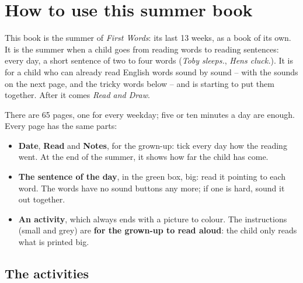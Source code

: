\section*{How to use this summer book}

This book is the summer of \textit{First Words}: its last 13 weeks, as
a book of its own. It is the summer when a child goes from reading words
to reading sentences: every day, a short sentence of two to four words
(\textit{Toby sleeps.}, \textit{Hens cluck.}). It is for a child who can
already read English words sound by sound -- with the sounds on the next
page, and the tricky words below -- and is starting to put them
together. After it comes \textit{Read and Draw}.

There are 65 pages, one for every weekday; five or ten minutes a day are
enough. Every page has the same parts:

\begin{itemize}[leftmargin=6mm]
\item \textbf{Date}, \textbf{Read} and \textbf{Notes}, for the grown-up:
  tick every day how the reading went. At the end of the summer, it shows
  how far the child has come.
\item \textbf{The sentence of the day}, in the green box, big: read it
  pointing to each word. The words have no sound buttons any more; if
  one is hard, sound it out together.
\item \textbf{An activity}, which always ends with a picture to colour.
  The instructions (small and grey) are \textbf{for the grown-up to read
  aloud}: the child only reads what is printed big.
\end{itemize}

\subsection*{The activities}


